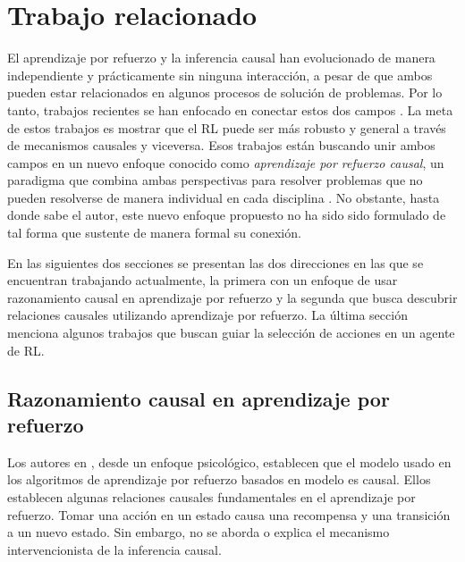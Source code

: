 \chapter{Trabajo relacionado}\label{chapter3}

\graphicspath{{Chapter3/Figs/}}


El aprendizaje por refuerzo y la inferencia
causal han evolucionado de manera 
independiente y prácticamente sin 
ninguna interacción, a pesar de que ambos
pueden estar relacionados en algunos
procesos de solución de problemas.
Por lo tanto, trabajos recientes
se han enfocado en conectar estos dos
campos  \cite{Gershman2017, 6-DBLP:journals/midm/YuDLR19, lu2018deconfounding, dasgupta2019causal}. La meta de estos trabajos es mostrar que el RL puede ser más robusto y general a través de mecanismos
causales y viceversa.
Esos trabajos están buscando unir ambos
campos en un nuevo enfoque conocido como
\textit{aprendizaje por refuerzo causal}, un paradigma que combina
ambas perspectivas para resolver problemas que no pueden
resolverse de manera individual en cada disciplina \cite{CausalRL2019EliasB, chaochao_2019}.
No obstante, hasta donde sabe el autor, 
este nuevo enfoque propuesto no ha sido 
sido formulado de tal forma que sustente de manera formal su conexión.


En las siguientes dos secciones se presentan las dos direcciones 
en las que se encuentran trabajando actualmente, la primera con
un enfoque de usar razonamiento causal en aprendizaje por refuerzo
y la segunda que busca descubrir relaciones causales utilizando
aprendizaje por refuerzo.
La última sección menciona algunos trabajos que buscan guiar la
selección de acciones en un agente de RL.

\section{Razonamiento causal en aprendizaje por refuerzo}


Los autores en \cite{Gershman2017}, desde un enfoque psicológico, establecen que
el modelo usado en los algoritmos de aprendizaje por refuerzo basados en modelo
es causal.
Ellos establecen algunas relaciones causales fundamentales en el aprendizaje por
refuerzo. Tomar una acción en un estado causa una recompensa y una 
transición a un nuevo estado.
Sin embargo, no se aborda o explica el mecanismo intervencionista de la inferencia causal.

